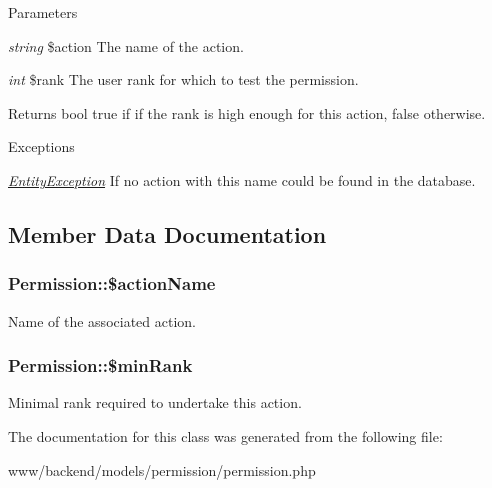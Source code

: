 \begin{DoxyParams}{Parameters}
\item[{\em string}]\$action The name of the action. \item[{\em int}]\$rank The user rank for which to test the permission.\end{DoxyParams}
\begin{DoxyReturn}{Returns}
bool true if if the rank is high enough for this action, false otherwise.
\end{DoxyReturn}

\begin{DoxyExceptions}{Exceptions}
\item[{\em \hyperlink{classEntityException}{EntityException}}]If no action with this name could be found in the database. \end{DoxyExceptions}


\subsection{Member Data Documentation}
\hypertarget{classPermission_ae5d62bba6b0bf9df502550081ce35db4}{
\subsubsection[{\$actionName}]{\setlength{\rightskip}{0pt plus 5cm}Permission::\$actionName}}
\label{classPermission_ae5d62bba6b0bf9df502550081ce35db4}
Name of the associated action. \hypertarget{classPermission_a21d0591b1aeff82d569b033fad2f521c}{
\subsubsection[{\$minRank}]{\setlength{\rightskip}{0pt plus 5cm}Permission::\$minRank}}
\label{classPermission_a21d0591b1aeff82d569b033fad2f521c}
Minimal rank required to undertake this action. 

The documentation for this class was generated from the following file:\begin{DoxyCompactItemize}
\item 
www/backend/models/permission/permission.php\end{DoxyCompactItemize}
